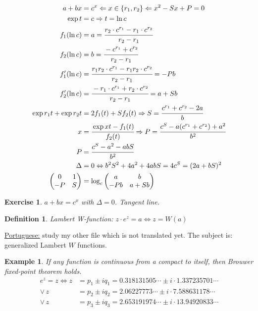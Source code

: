 \documentclass[12pt,a4paper]{article}
\newtheorem{exercise}{Exercise}[section]
\newtheorem{definition}{Definition}[section]
\newtheorem{example}{Example}[section]
\begin{document}
\begin{align}
a + bx &= c^x \Leftarrow x \in \{ r_1, r_2 \} \Leftarrow x^2 - Sx + P = 0 \\
\exp t &= c \Rightarrow t = \ln c \\
f_1(\ln c) &= a = \cfrac{r_2 \cdot c^{r_1} - r_1 \cdot c^{r_2}}{r_2 - r_1} \\
f_2(\ln c) &= b = \cfrac{- c^{r_1} + c^{r_2}}{r_2 - r_1} \\
f_1'(\ln c) &= \cfrac{r_1 r_2 \cdot c^{r_1} - r_1 r_2 \cdot c^{r_2}}{r_2 - r_1} = - Pb \\
f_2'(\ln c) &= \cfrac{- r_1 \cdot c^{r_1} + r_2 \cdot c^{r_2}}{r_2 - r_1} = a + S b \\
\exp r_1 t + \exp r_2 t &= 2 f_1(t) + S f_2(t) \Rightarrow S = \cfrac{c^{r_1} + c^{r_2} - 2 a}{b} \\
x &= \cfrac{\exp xt - f_1(t)}{f_2(t)} \Rightarrow P = \cfrac{c^S - a (c^{r_1} + c^{r_2}) + a^2}{b^2} \\
P &= \cfrac{c^S - a^2 - abS}{b^2} \\
\Delta &= 0 \Leftrightarrow b^2 S^2 + 4 a^2 + 4 abS = 4 c^S = (2a + bS)^2 \\
\left(\begin{matrix}0 & 1 \\ -P & S \end{matrix}\right) &= \log_c \left(\begin{matrix}a & b \\ - P b & a + S b \end{matrix}\right) \label{exp_M}
\end{align}

\begin{exercise}
$a + bx = c^x$ with $\Delta = 0$. Tangent line.
\end{exercise}

\begin{definition}
Lambert W-function: $z\cdot e^z = a \Leftrightarrow z = W(a)$
\end{definition}

\href{https://www,dropbox,com/s/vxc39f4obrmw2ix/wlambert,pdf?dl=0}{\color{blue}\underline{Portuguese:}} study my other file which is not translated yet. The subject is: generalized Lambert $W$ functions.

\begin{example} If any function is continuous from a compact to itself, then Brouwer fixed-point theorem holds.
\begin{align}
e^z = z \Leftrightarrow z &= p_1 \pm i q_1 = 0.318131505\cdots \pm i \cdot 1.337235701\cdots \nonumber \\
\vee\,z &= p_2 \pm i q_2 = 2.06227773\cdots \pm i \cdot 7.588631178\cdots \nonumber \\
\vee\,z &= p_3 \pm i q_3 = 2.653191974\cdots \pm i \cdot 13.94920833\cdots
\end{align}
\end{example}
\end{document}
